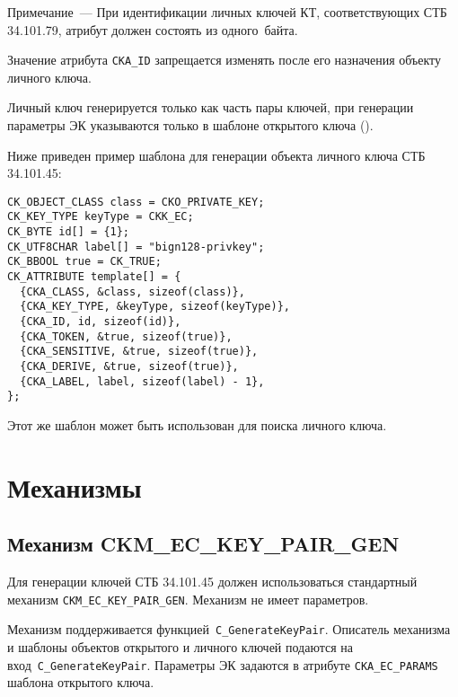 \begin{note}
Примечание~---
При идентификации личных ключей КТ, соответствующих СТБ 34.101.79,
атрибут должен состоять из одного~байта.
\end{note}

Значение атрибута \verb|CKA_ID| запрещается изменять
после его назначения объекту личного ключа.


Личный ключ генерируется только как часть пары ключей,
при генерации параметры ЭК указываются только в шаблоне
открытого ключа ().

Ниже приведен пример шаблона для генерации объекта личного ключа СТБ 34.101.45:
\begin{verbatim}
CK_OBJECT_CLASS class = CKO_PRIVATE_KEY;
CK_KEY_TYPE keyType = CKK_EC;
CK_BYTE id[] = {1};
CK_UTF8CHAR label[] = "bign128-privkey";
CK_BBOOL true = CK_TRUE;
CK_ATTRIBUTE template[] = {
  {CKA_CLASS, &class, sizeof(class)},
  {CKA_KEY_TYPE, &keyType, sizeof(keyType)},
  {CKA_ID, id, sizeof(id)},
  {CKA_TOKEN, &true, sizeof(true)},
  {CKA_SENSITIVE, &true, sizeof(true)},
  {CKA_DERIVE, &true, sizeof(true)},
  {CKA_LABEL, label, sizeof(label) - 1},
};
\end{verbatim}

Этот же шаблон может быть использован для поиска личного ключа.

\section{Механизмы}

\subsection{Механизм CKM\_EC\_KEY\_PAIR\_GEN}


Для генерации ключей СТБ 34.101.45 должен использоваться стандартный 
механизм \verb|CKM_EC_KEY_PAIR_GEN|. Механизм не имеет параметров. 

Механизм поддерживается функцией~\verb|C_GenerateKeyPair|. 
%
Описатель механизма и шаблоны объектов открытого и личного
ключей подаются на вход~\verb|C_GenerateKeyPair|. Параметры ЭК задаются в 
атрибуте \verb|CKA_EC_PARAMS| шаблона открытого ключа.


